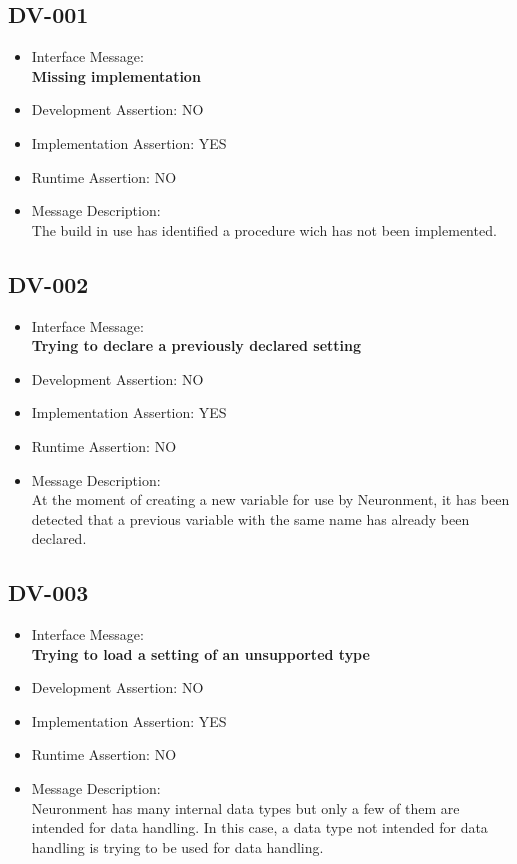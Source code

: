 \subsection{DV-001}
\begin{itemize}
  \item Interface Message:\\[1em]
    \textbf{Missing implementation}
  \item Development Assertion: NO
  \item Implementation Assertion: YES
  \item Runtime Assertion: NO
  \item Message Description:\\[1em]
    The build in use has identified a procedure wich has not been implemented.
\end{itemize}

\subsection{DV-002}
\begin{itemize}
  \item Interface Message:\\[1em]
    \textbf{Trying to declare a previously declared setting}
  \item Development Assertion: NO
  \item Implementation Assertion: YES
  \item Runtime Assertion: NO
  \item Message Description:\\[1em]
    At the moment of creating a new variable for use by Neuronment, it has been detected that a previous variable with the same name has already been declared.
\end{itemize}

\subsection{DV-003}
\begin{itemize}
  \item Interface Message:\\[1em]
    \textbf{Trying to load a setting of an unsupported type}
  \item Development Assertion: NO
  \item Implementation Assertion: YES
  \item Runtime Assertion: NO
  \item Message Description:\\[1em]
    Neuronment has many internal data types but only a few of them are intended for data handling. In this case, a data type not intended for data handling is trying to be used for data handling.
\end{itemize}

